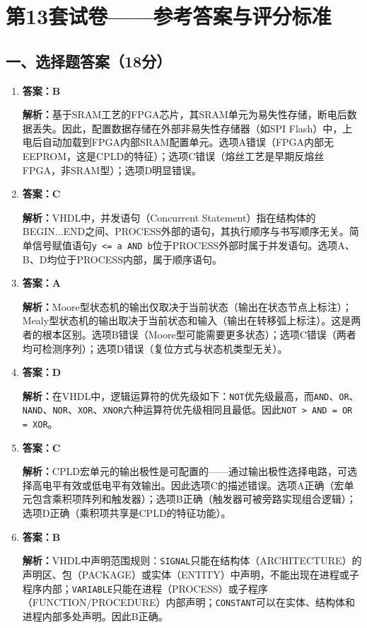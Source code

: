 \chapter{第13套试卷——参考答案与评分标准}

\section{一、选择题答案（18分）}

\begin{enumerate}[label=\arabic*.]

\item \textbf{答案：B}

\textbf{解析：}基于SRAM工艺的FPGA芯片，其SRAM单元为易失性存储，断电后数据丢失。因此，配置数据存储在外部非易失性存储器（如SPI Flash）中，上电后自动加载到FPGA内部SRAM配置单元。选项A错误（FPGA内部无EEPROM，这是CPLD的特征）；选项C错误（熔丝工艺是早期反熔丝FPGA，非SRAM型）；选项D明显错误。

\item \textbf{答案：C}

\textbf{解析：}VHDL中，并发语句（Concurrent Statement）指在结构体的BEGIN...END之间、PROCESS外部的语句，其执行顺序与书写顺序无关。简单信号赋值语句\texttt{y <= a AND b}位于PROCESS外部时属于并发语句。选项A、B、D均位于PROCESS内部，属于顺序语句。

\item \textbf{答案：A}

\textbf{解析：}Moore型状态机的输出仅取决于当前状态（输出在状态节点上标注）；Mealy型状态机的输出取决于当前状态和输入（输出在转移弧上标注）。这是两者的根本区别。选项B错误（Moore型可能需要更多状态）；选项C错误（两者均可检测序列）；选项D错误（复位方式与状态机类型无关）。

\item \textbf{答案：D}

\textbf{解析：}在VHDL中，逻辑运算符的优先级如下：\texttt{NOT}优先级最高，而\texttt{AND}、\texttt{OR}、\texttt{NAND}、\texttt{NOR}、\texttt{XOR}、\texttt{XNOR}六种运算符优先级相同且最低。因此\texttt{NOT > AND = OR = XOR}。

\item \textbf{答案：C}

\textbf{解析：}CPLD宏单元的输出极性是可配置的——通过输出极性选择电路，可选择高电平有效或低电平有效输出。因此选项C的描述错误。选项A正确（宏单元包含乘积项阵列和触发器）；选项B正确（触发器可被旁路实现组合逻辑）；选项D正确（乘积项共享是CPLD的特征功能）。

\item \textbf{答案：B}

\textbf{解析：}VHDL中声明范围规则：\texttt{SIGNAL}只能在结构体（ARCHITECTURE）的声明区、包（PACKAGE）或实体（ENTITY）中声明，不能出现在进程或子程序内部；\texttt{VARIABLE}只能在进程（PROCESS）或子程序（FUNCTION/PROCEDURE）内部声明；\texttt{CONSTANT}可以在实体、结构体和进程内部多处声明。因此B正确。

\end{enumerate}

